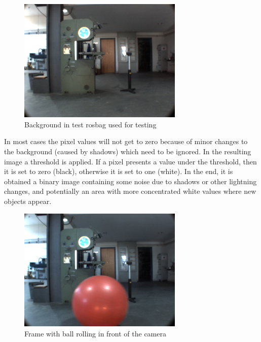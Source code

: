 \begin{figure}[htp]
	
	\centering
	\includegraphics[width=0.7\textwidth]{capcalib/imgs/background.png}
	
	\caption{Background in test rosbag used for testing}
	\label{fig:background}
	
\end{figure}

In most cases the pixel values will not get to zero because of minor changes to the background (caused by shadows) which need to be ignored. In the resulting image a threshold is applied. If a pixel presents a value under the threshold, then it is set to zero (black), otherwise it is set to one (white). In the end, it is obtained a binary image containing some noise due to shadows or other lightning changes, and potentially an area with more concentrated white values where new objects appear. 


\begin{figure}[htp]
	
	\centering
	\includegraphics[width=0.7\textwidth]{capcalib/imgs/ball_test.png}
	
	\caption{Frame with ball rolling in front of the camera}
	\label{fig:balltest}
	
\end{figure}


